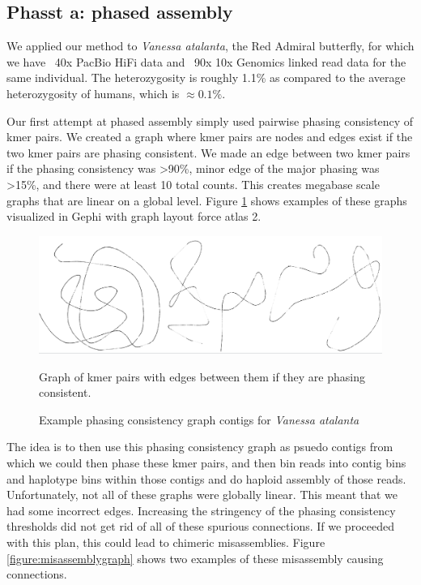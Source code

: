 {\subsection{Phasst a: phased assembly}

\par{
We applied our method to \textit{Vanessa atalanta}, the Red Admiral butterfly, for which we have ~40x PacBio HiFi data and ~90x 10x Genomics linked read data for the same individual. The heterozygosity is roughly 1.1\% as compared to the average heterozygosity of humans, which is $\approx0.1\%$.
} \\

\par{
Our first attempt at phased assembly simply used pairwise phasing consistency of kmer pairs. We created a graph where kmer pairs are nodes and edges exist if the two kmer pairs are phasing consistent. We made an edge between two kmer pairs if the phasing consistency was >90\%, minor edge of the major phasing was >15\%, and there were at least 10 total counts. This creates megabase scale graphs that are linear on a global level. Figure \ref{figure:phasegraph} shows examples of these graphs visualized in Gephi with graph layout force atlas 2\cite{gephi}\cite{forceatlas2}. 
}

\begin{figure}[htbp!]
\caption{Example phasing consistency graph contigs for \textit{Vanessa atalanta}}
\label{figure:phasegraph}
\begin{centering}
\includegraphics[width=\textwidth]{phasinggraph.png}
\par{Graph of kmer pairs with edges between them if they are phasing consistent. }
\end{centering}
\end{figure}

\par{
The idea is to then use this phasing consistency graph as psuedo contigs from which we could then phase these kmer pairs, and then bin reads into contig bins and haplotype bins within those contigs and do haploid assembly of those reads. Unfortunately, not all of these graphs were globally linear. This meant that we had some incorrect edges. Increasing the stringency of the phasing consistency thresholds did not get rid of all of these spurious connections. If we proceeded with this plan, this could lead to chimeric misassemblies. Figure \ref{figure:misassemblygraph} shows two examples of these misassembly causing connections.
}

}
